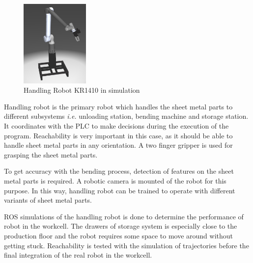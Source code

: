 \begin{figure}[h]
    \centering
    \includegraphics[width=0.3\textwidth]{figures/handling-robot-simulation.png}
    \caption{Handling Robot KR1410 in simulation}
    \label{fig:handling-robot-simulation}
\end{figure}
Handling robot is the primary robot which handles the sheet metal parts to different subsystems \textit{i.e.}
unloading station, bending machine and storage station.
It coordinates with the PLC to make decisions during the execution of the program. Reachability
is very important in this case, as it should be able to handle sheet metal parts in any orientation.
A two finger gripper is used for grasping the sheet metal parts.

To get accuracy with the bending process, detection of features on the sheet metal parts is required.
A robotic camera is mounted of the robot for this purpose. In this way, handling robot can be trained 
to operate with different variants of sheet metal parts.

ROS simulations of the handling robot is done to determine the performance of robot in the workcell.
The drawers of storage system is especially close
to the production floor and the robot requires some space to move around without getting stuck. 
Reachability is tested with the simulation of trajectories before the final integration of the real robot
in the workcell.